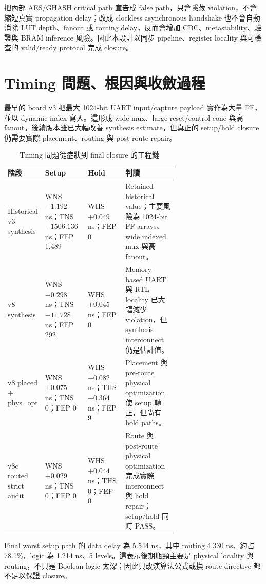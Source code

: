 \documentclass[UTF8,fontset=none,11pt,a4paper]{ctexrep}
\begin{document}
把內部 AES/GHASH critical path 宣告成 false path，只會隱藏 violation，不會縮短真實 propagation delay；改成 clockless asynchronous handshake 也不會自動消除 LUT depth、fanout 或 routing delay，反而會增加 CDC、metastability、驗證與 BRAM inference 風險。因此本設計以同步 pipeline、register locality 與可檢查的 valid/ready protocol 完成 closure。

\section{Timing 問題、根因與收斂過程}

最早的 board v3 把最大 1024-bit UART input/capture payload 實作為大量 FF，並以 dynamic index 寫入。這形成 wide mux、large reset/control cone 與高 fanout。後續版本雖已大幅改善 synthesis estimate，但真正的 setup/hold closure 仍需要實際 placement、routing 與 post-route repair。

\begin{table}[H]
\centering
\small
\caption{Timing 問題從症狀到 final closure 的工程鏈}
\begin{tabularx}{\linewidth}{>{\raggedright\arraybackslash}p{0.19\linewidth} >{\raggedright\arraybackslash}p{0.25\linewidth} >{\raggedright\arraybackslash}p{0.22\linewidth} X}
\toprule
階段 & Setup & Hold & 判讀 \\
\midrule
Historical v3 synthesis & WNS $-1.192$ ns；TNS $-1506.136$ ns；FEP 1,489 & WHS $+0.049$ ns；FEP 0 & Retained historical value；主要風險為 1024-bit FF arrays、wide indexed mux 與高 fanout。 \\
v8 synthesis & WNS $-0.298$ ns；TNS $-11.728$ ns；FEP 292 & WHS $+0.045$ ns；FEP 0 & Memory-based UART 與 RTL locality 已大幅減少 violation，但 synthesis interconnect 仍是估計值。 \\
v8 placed + phys\_opt & WNS $+0.075$ ns；TNS 0；FEP 0 & WHS $-0.082$ ns；THS $-0.364$ ns；FEP 9 & Placement 與 pre-route physical optimization 使 setup 轉正，但尚有 hold paths。 \\
v8c routed strict audit & WNS $+0.029$ ns；TNS 0；FEP 0 & WHS $+0.044$ ns；THS 0；FEP 0 & Route 與 post-route physical optimization 完成實際 interconnect 與 hold repair；setup/hold 同時 PASS。 \\
\bottomrule
\end{tabularx}
\end{table}

Final worst setup path 的 data delay 為 5.544 ns，其中 routing 4.330 ns、約占 78.1\%，logic 為 1.214 ns、5 levels。這表示後期瓶頸主要是 physical locality 與 routing，不只是 Boolean logic 太深；因此只改演算法公式或換 route directive 都不足以保證 closure。
\end{document}
